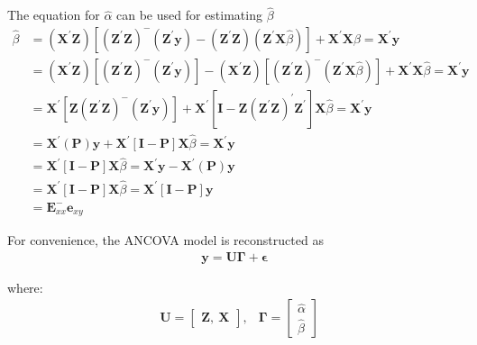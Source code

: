 \documentclass[10pt, twoside, openleft]{article}
\newcommand{\alphahat}{\hat{\alpha}} %
\newcommand{\betahat}{\hat{\beta}} %
\begin{document}
\noindent
The equation for $\alphahat$ can be used for estimating $\betahat$
\begin{equation*}
\begin{aligned}
\betahat & = ( \mathbf{X}^{'} \mathbf{Z} ) [ ( \mathbf{Z}^{'} \mathbf{Z})^{-}
( \mathbf{Z}^{'} \mathbf{y} ) - ( \mathbf{Z}^{'} \mathbf{Z} ) ( \mathbf{Z}^{'} \mathbf{X}
\betahat ) ] + \mathbf{X}^{'} \mathbf{X} \betahat = \mathbf{X}^{'} \mathbf{y} \\
	 & = ( \mathbf{X}^{'} \mathbf{Z} ) [ (\mathbf{Z}^{'} \mathbf{Z} )^{-}
( \mathbf{Z}^{'} \mathbf{y} ) ] - ( \mathbf{X}^{'} \mathbf{Z} )
[ ( \mathbf{Z}^{'} \mathbf{Z} )^{-} ( \mathbf{Z}^{'} \mathbf{X}
\betahat ) ] + \mathbf{X}^{'} \mathbf{X} \betahat = \mathbf{X}^{'} \mathbf{y} \\
	 & = \mathbf{X}^{'} [ \mathbf{Z} ( \mathbf{Z}^{'} \mathbf{Z} )^{-}
( \mathbf{Z}^{'} \mathbf{y} ) ] + \mathbf{X}^{'} [ \mathbf{I} - \mathbf{Z}
( \mathbf{Z}^{'} \mathbf{Z} )^{'} \mathbf{Z}^{'} ] \mathbf{X} \betahat = \mathbf{X}^{'} \mathbf{y} \\
	 & = \mathbf{X}^{'} ( \mathbf{P} ) \mathbf{y} + \mathbf{X}^{'} [ \mathbf{I} - \mathbf{P}]
\mathbf{X} \betahat = \mathbf{X}^{'} \mathbf{y} \\
	 & = \mathbf{X}^{'} [ \mathbf{I} - \mathbf{P} ] \mathbf{X} \betahat = \mathbf{X}^{'} \mathbf{y}
- \mathbf{X}^{'} ( \mathbf{P} ) \mathbf{y} \\
	 & = \mathbf{X}^{'} [ \mathbf{I} - \mathbf{P} ] \mathbf{X} \betahat = \mathbf{X}^{'}
[ \mathbf{I} - \mathbf{P} ] \mathbf{y} \\
	 & = \mathbf{E}_{xx}^{-} \mathbf{e}_{xy}
\end{aligned}
\end{equation*}
\smallskip

\noindent
For convenience, the ANCOVA model is reconstructed as
\begin{equation*}
\begin{aligned}
\mathbf{y} = \mathbf{U} \mathbf{\Gamma} + \mathbf{\epsilon}
\end{aligned}
\end{equation*}
\smallskip

where:
\begin{equation*}
\begin{aligned}
& \mathbf{U} =
\left[ \begin{array}{c}
    \mathbf{Z}, \ \mathbf{X}
\end{array}\right],
& \mathbf{\Gamma} =
\left[ \begin{array}{c}
    \alphahat \\
    \betahat
\end{array}\right]
\end{aligned}
\end{equation*}
\smallskip
\end{document}
